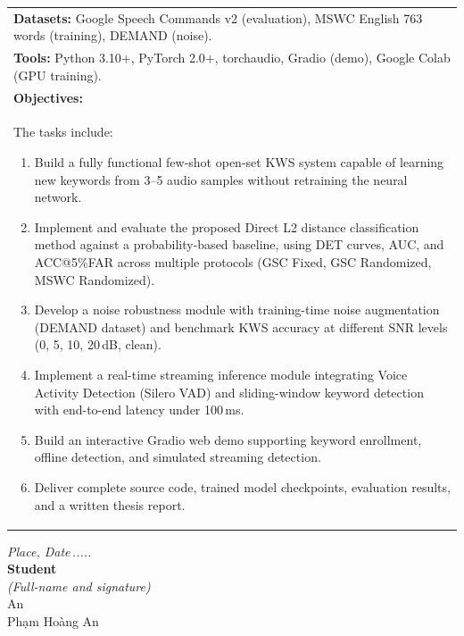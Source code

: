 \documentclass[11pt,a4paper]{article}
\begin{document}
\begin{tabularx}{\textwidth}{|X|}
\vspace{0.1cm}
\textbf{Datasets:} Google Speech Commands v2 (evaluation), MSWC English 763 words (training), DEMAND (noise).\\
\textbf{Tools:} Python 3.10+, PyTorch 2.0+, torchaudio, Gradio (demo), Google Colab (GPU training).
\\[0.15cm]
\hline

\textbf{Objectives:} \\[0.1cm]
The tasks include:
\begin{enumerate}[leftmargin=0.8cm, topsep=1pt, itemsep=2pt, parsep=0pt]
    \item Build a fully functional few-shot open-set KWS system capable of learning new keywords from 3--5 audio samples without retraining the neural network.
    \item Implement and evaluate the proposed Direct L2 distance classification method against a probability-based baseline, using DET curves, AUC, and ACC@5\%FAR across multiple protocols (GSC Fixed, GSC Randomized, MSWC Randomized).
    \item Develop a noise robustness module with training-time noise augmentation (DEMAND dataset) and benchmark KWS accuracy at different SNR levels (0, 5, 10, 20\,dB, clean).
    \item Implement a real-time streaming inference module integrating Voice Activity Detection (Silero VAD) and sliding-window keyword detection with end-to-end latency under 100\,ms.
    \item Build an interactive Gradio web demo supporting keyword enrollment, offline detection, and simulated streaming detection.
    \item Deliver complete source code, trained model checkpoints, evaluation results, and a written thesis report.
\end{enumerate}
\\[0.1cm]
\hline
\end{tabularx}

\vspace{1cm}

\hfill
\begin{minipage}{0.45\textwidth}
    \begin{center}
    \textit{Place, Date\,.....}\\[0.5cm]
    \textbf{Student}\\[0.15cm]
    \textit{(Full-name and signature)}\\[0.8cm]
    {\Large An}\\[0.1cm]
    Phạm Hoàng An
    \end{center}
\end{minipage}
\hspace{1.5cm}
\end{document}
